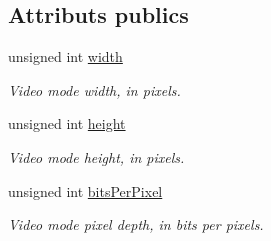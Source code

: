 \subsection*{Attributs publics}
\begin{DoxyCompactItemize}
\item 
\mbox{\label{classsf_1_1VideoMode_a9b3b2ad2cac6b9c266823fb5ed506d90}} 
unsigned int \hyperlink{classsf_1_1VideoMode_a9b3b2ad2cac6b9c266823fb5ed506d90}{width}
\begin{DoxyCompactList}\small\item\em Video mode width, in pixels. \end{DoxyCompactList}\item 
\mbox{\label{classsf_1_1VideoMode_a5a88d44c9470db7474361a42a189342d}} 
unsigned int \hyperlink{classsf_1_1VideoMode_a5a88d44c9470db7474361a42a189342d}{height}
\begin{DoxyCompactList}\small\item\em Video mode height, in pixels. \end{DoxyCompactList}\item 
\mbox{\label{classsf_1_1VideoMode_aa080f1ef96a1008d58b1920eceb189df}} 
unsigned int \hyperlink{classsf_1_1VideoMode_aa080f1ef96a1008d58b1920eceb189df}{bits\+Per\+Pixel}
\begin{DoxyCompactList}\small\item\em Video mode pixel depth, in bits per pixels. \end{DoxyCompactList}\end{DoxyCompactItemize}
